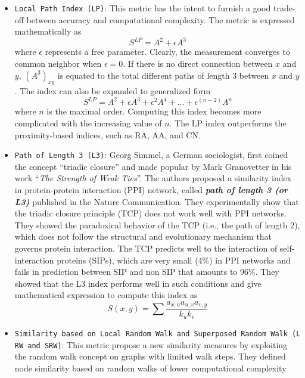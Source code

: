 \begin{itemize}
    \item \texttt{Local\ Path\ Index\ (LP)}: This metric has the intent to furnish
          a good trade-off between accuracy and computational complexity. The
          metric is expressed mathematically as \[S^{LP} = A^2 + \epsilon A^3\]
          where $\epsilon$ represents a free parameter. Clearly, the measurement
          converges to common neighbor when \(\epsilon = 0\). If there is no
          direct connection between \(x\) and \(y\), \((A^3)_{xy}\) is equated to
          the total different paths of length 3 between \(x\) and \(y\). The index
          can also be expanded to generalized form
          \[S^{LP} = A^2 + \epsilon A^3 + \epsilon^2 A^4 + ... + \epsilon^{(n−2)} A^n\]
          where \(n\) is the maximal order. Computing this index becomes more
          complicated with the increasing value of \(n\). The LP index outperforms
          the proximity-based indices, such as RA, AA, and CN.
    \item \texttt{Path\ of\ Length\ 3\ (L3)}: Georg Simmel, a German sociologist,
          first coined the concept ``triadic closure'' and made popular by Mark
          Granovetter in his work ``\emph{The Strength of Weak Ties}''. The
          authors proposed a similarity index in protein-protein interaction (PPI)
          network, called \textbf{\emph{path of length 3 (or L3)}} published in
          the Nature Communication. They experimentally show that the triadic
          closure principle (TCP) does not work well with PPI networks. They
          showed the paradoxical behavior of the TCP (i.e., the path of length 2),
          which does not follow the structural and evolutionary mechanism that
          governs protein interaction. The TCP predicts well to the interaction of
          self-interaction proteins (SIPs), which are very small (4\%) in PPI
          networks and fails in prediction between SIP and non SIP that amounts to
          96\%. They showed that the L3 index performs well in such conditions and
          give mathematical expression to compute this index as
          \[S(x, y) = \sum \frac{a_{x,u} a_{u,v} a_{v,y}}{k_u k_v}\]
    \item \texttt{Similarity\ based\ on\ Local\ Random\ Walk\ and\ Superposed\ Random\ Walk\ (LRW\ and\ SRW)}:
          This metric propose a new similarity measures by exploiting the random
          walk concept on graphs with limited walk steps. They defined node
          similarity based on random walks of lower computational complexity

\end{itemize}
